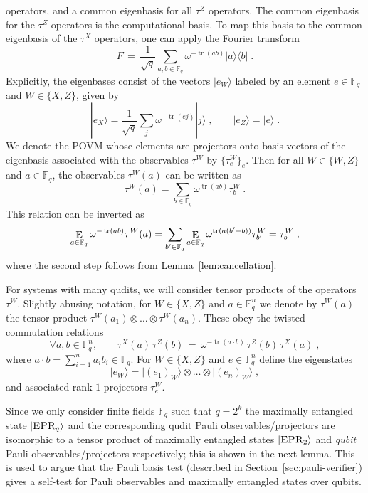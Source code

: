 \documentclass[11pt]{article}
\theoremstyle{definition}
\newcommand{\ket}[1]{|#1\rangle}
\newcommand{\bra}[1]{\langle#1|}
\newcommand{\qp}{\tau}
\newcommand{\F}{\ensuremath{\mathbb{F}}}
\newcommand{\ot}{\otimes}
\newcommand{\Fq}{\F_q}
\DeclareMathOperator{\tr}{tr}
\newcommand{\E}{\mathop{\mathbb{E}}\displaylimits} %
\newcommand{\labelstyle}[1]{\ensuremath{\textsc{#1}}\xspace}
\newcommand{\EPR}{\labelstyle{EPR}}
\begin{document}
operators, and a common eigenbasis for all $\qp^Z$ operators.
The common eigenbasis for the $\qp^Z$ operators is the computational basis.
To map this basis to the common eigenbasis of the $\qp^X$ operators, one can
apply the Fourier transform
\begin{equation}
  \label{eq:fourier-f}
  F \,=\, \frac{1}{\sqrt{q}} \sum_{a, b\in \Fq} \omega^{-\tr(ab)}
  \ket{a}\bra{b}\;.
\end{equation}
Explicitly, the eigenbases consist of the vectors $\ket{e_W}$ labeled by an
element $e \in \Fq$ and $W \in \{X, Z\}$, given by
\begin{equation*}
  \ket{e_X} = \frac{1}{\sqrt{q}} \sum_j \omega^{- \tr(e j)} \ket{j}\;, \qquad
  \ket{e_Z}   = \ket{e}\;.
\end{equation*}
We denote the POVM whose elements are projectors onto basis vectors of the
eigenbasis associated with the observables $\qp^W$ by $\{\qp^W_e\}_e$.
Then for all $W \in \{W,Z\}$ and $a\in \Fq$, the observables $\qp^W(a)$ can be
written as
\begin{equation}\label{eq:pauli-obs-proj}
  \qp^W(a) = \sum_{b \in \Fq} \omega^{\tr(a b)} \qp^W_b\;.
\end{equation}
This relation can be inverted as
\begin{equation}\label{eq:pauli-inversion-0}
  \E_{a\in \F_q} \omega^{-\tr(ab)} \qp^W(a) = \sum_{b'\in \F_q} \E_{a\in \F_q}
  \omega^{\tr(a(b'-b))} \qp^W_{b'} = \qp^W_b\;,
\end{equation}
where the second step follows from Lemma~\ref{lem:cancellation}.

For systems with many qudits, we will consider tensor products of the operators
$\qp^W$.
Slightly abusing notation, for $W \in \{X, Z\}$ and $a \in \Fq^n$ we denote by
$\qp^W(a)$ the tensor product $\qp^W(a_1) \ot \dots \ot \qp^W(a_n)$.
These obey the twisted commutation relations
\begin{equation*}
  \forall a,b\in \Fq^n,\qquad \qp^X(a)\, \qp^Z(b) \,=\, \omega^{-\tr (a \cdot
    b)}\, \qp^Z(b)\, \qp^X(a)\;,
\end{equation*}
where $a \cdot b = \sum_{i=1}^{n} a_i b_i \in \Fq$.
For $W\in\{X,Z\}$ and $e \in \Fq^n$ define the eigenstates
\[ \ket{e_W} = \ket{(e_1)_W} \ot \dots \ot \ket{(e_n)_W}\;, \]
and associated rank-$1$ projectors $\qp^W_e$. 

Since we only consider finite fields $\F_q$ such that $q = 2^k$ the maximally
entangled state $\ket{\EPR_q}$ and the corresponding qudit Pauli
observables/projectors are isomorphic to a tensor product of maximally entangled
states $\ket{\EPR_2}$ and \emph{qubit} Pauli observables/projectors
respectively; this is shown in the next lemma.
This is used to argue that the Pauli basis test (described in
Section~\ref{sec:pauli-verifier}) gives a self-test for Pauli observables and
maximally entangled states over qubits.
\end{document}
